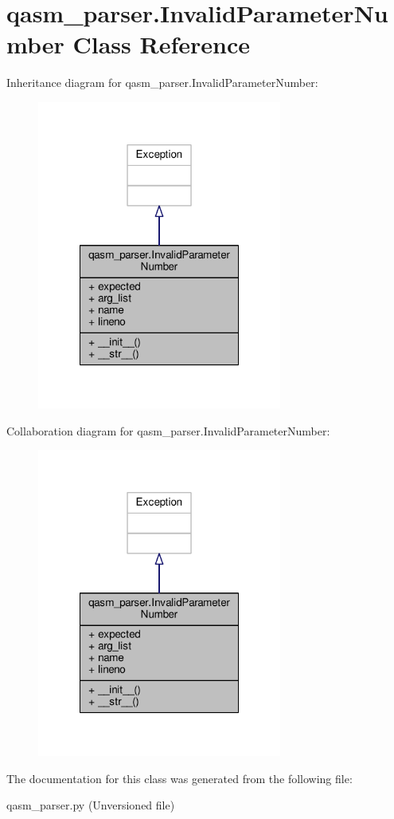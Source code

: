 \hypertarget{classqasm__parser_1_1InvalidParameterNumber}{\section{qasm\-\_\-parser.\-Invalid\-Parameter\-Number Class Reference}
\label{classqasm__parser_1_1InvalidParameterNumber}
}


Inheritance diagram for qasm\-\_\-parser.\-Invalid\-Parameter\-Number\-:
\nopagebreak
\begin{figure}[H]
\begin{center}
\leavevmode
\includegraphics[width=228pt]{d3/d5b/classqasm__parser_1_1InvalidParameterNumber__inherit__graph}
\end{center}
\end{figure}


Collaboration diagram for qasm\-\_\-parser.\-Invalid\-Parameter\-Number\-:
\nopagebreak
\begin{figure}[H]
\begin{center}
\leavevmode
\includegraphics[width=228pt]{dd/dba/classqasm__parser_1_1InvalidParameterNumber__coll__graph}
\end{center}
\end{figure}


The documentation for this class was generated from the following file\-:\begin{DoxyCompactItemize}
\item 
qasm\-\_\-parser.\-py (\-Unversioned file)\end{DoxyCompactItemize}
